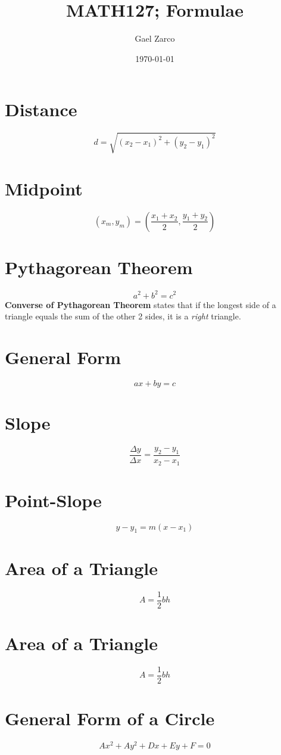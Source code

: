 \documentclass{article}
\title{MATH127; Formulae}
\author{Gael Zarco}
\date{\today}
\begin{document}
\maketitle

\section{Distance} 
\[
  d = \sqrt{(x_2 - x_1)^2 + (y_2 - y_1)^2}
\]

\section{Midpoint}
\[
  (x_m, y_m) = (\dfrac{x_1 + x_2}{2}, \dfrac{y_1 + y_2}{2}) 
\]

\section{Pythagorean Theorem}
\[
  a^2 + b^2 = c^2
\]
\textbf{Converse of Pythagorean Theorem} states that if the longest side of a
triangle equals the sum of the other 2 sides, it is a \textit{right} triangle.

\section{General Form}
\[
  ax + by = c
\]

\section{Slope}
\[
  \dfrac{\Delta y}{\Delta x} = \dfrac{y_2 - y_1}{x_2 - x_1}
\]

\section{Point-Slope}
\[
  y - y_1 = m(x - x_1)
\]

\section{Area of a Triangle}
\[
  A = \dfrac{1}{2}bh
\]

\section{Area of a Triangle}
\[
  A = \dfrac{1}{2}bh
\]

\section{General Form of a Circle}
\[
  Ax^2 + Ay^2 + Dx + Ey + F = 0
\]
\end{document}
